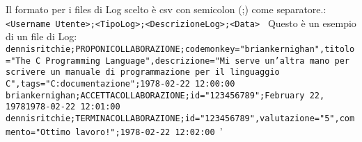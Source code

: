 Il formato per i files di Log scelto è csv con semicolon (;) come separatore.:
\newline
\texttt{
	<Username Utente>;<TipoLog>;<DescrizioneLog>;<Data>
}
\newline
Questo è un esempio di un file di Log:
\newline
\texttt{
	dennisritchie;PROPONICOLLABORAZIONE;codemonkey="briankernighan",titolo="The C Programming Language",descrizione="Mi serve un'altra mano per scrivere un manuale di programmazione per il linguaggio C",tags="C:documentazione";1978-02-22 12:00:00 \newline
	briankernighan;ACCETTACOLLABORAZIONE;id="123456789";February 22, 19781978-02-22 12:01:00 \newline
	dennisritchie;TERMINACOLLABORAZIONE;id="123456789",valutazione="5",commento="Ottimo lavoro!";1978-02-22 12:02:00 \newline
}'
